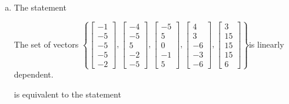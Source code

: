 \begin{exerciseAnswer}
\begin{enumerate}[(a)]
\item The statement 
\begin{center}\begin{minipage}{0.8\textwidth}
 The set of vectors \( \left\{ \left[\begin{array}{c}
-1 \\
-5 \\
-5 \\
-5 \\
-2
\end{array}\right] , \left[\begin{array}{c}
-4 \\
-5 \\
5 \\
-2 \\
-5
\end{array}\right] , \left[\begin{array}{c}
-5 \\
5 \\
0 \\
-1 \\
5
\end{array}\right] , \left[\begin{array}{c}
4 \\
3 \\
-6 \\
-3 \\
-6
\end{array}\right] , \left[\begin{array}{c}
3 \\
15 \\
15 \\
15 \\
6
\end{array}\right] \right\} \)is linearly dependent.
\end{minipage}\end{center}
     is equivalent to the statement 
\begin{center}\begin{minipage}{0.8\textwidth}
 The vector equation \( x_{1} \left[\begin{array}{c}
-1 \\
-5 \\
-5 \\
-5 \\
-2
\end{array}\right] + x_{2} \left[\begin{array}{c}
-4 \\
-5 \\

\end{array}
\end{minipage}
\end{center}
\end{enumerate}
\end{exerciseAnswer}
